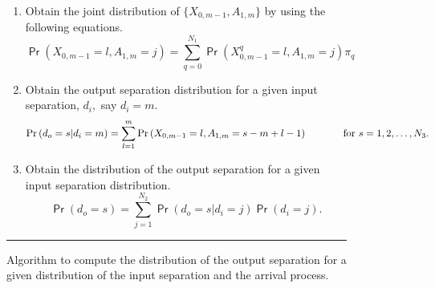 \documentclass[11pt]{article}
\newcommand{\prob}[1]{\mathsf{\Pr}\left(#1\right)}
\begin{document}
{\begin{figure}
{{\begin{enumerate}
\begin{enumerate}
          \item Transformations
            \begin{displaymath}
              \prob{X_{0,m-1}^q=l, A_{1,m}=j}  = 
              \begin{cases}  
                \prob{X_{0,m-1}^0=l-q, A_{1,m}=j} & l < m \mbox{ and
                } q \leq  l-1 \\ 
                \sum_{t=m-q}^{m} \prob{X_{0,m-1}^0=t, A_{1,m} =j} &
                l=m \mbox{ and } q < l-1  \\
                \prob{A_{1,m}=j} & l=m \mbox{ and } q \geq l-1 \\
                0 & \mbox{otherwise}
              \end{cases}
            \end{displaymath}
          \end{enumerate}
        
        \item Obtain the joint distribution of $\{X_{0,m-1},
          A_{1,m}\}$ by using the following equations.
          \begin{displaymath}
            \prob{X_{0,m-1}=l, A_{1,m}=j } = \sum_{q=0}^{N_1}
            \prob{X^q_{0,m-1}=l, A_{1,m}=j} \pi_q
          \end{displaymath}

        \item Obtain the output separation distribution for a given
          input separation, $d_i,$ say $d_i=m.$
          \begin{displaymath}
            \prob{d_o=s|d_i=m} = \sum_{l=1}^m \prob{X_{0,m-1}=l,
              A_{1,m}=s-m+l-1} \hspace{0.5in} \mbox{for
              $s=1,2,\ldots,N_3$}.   
           \end{displaymath}

        \item Obtain the distribution of the output separation for a
          given input separation distribution.
          \begin{displaymath}
            \prob{d_o=s} =\sum_{j=1}^{N_2} \prob{d_o=s|d_i=j} \prob{d_i=j} . 
          \end{displaymath}
        \end{enumerate}
      }
    }
  \rule{6.3in}{2mm}
  
  \caption{Algorithm to compute the distribution of the output
    separation for a given distribution of the input separation and
    the arrival process.}
  \label{alg:boxed-algorithm}
\end{figure}
}
\end{document}
